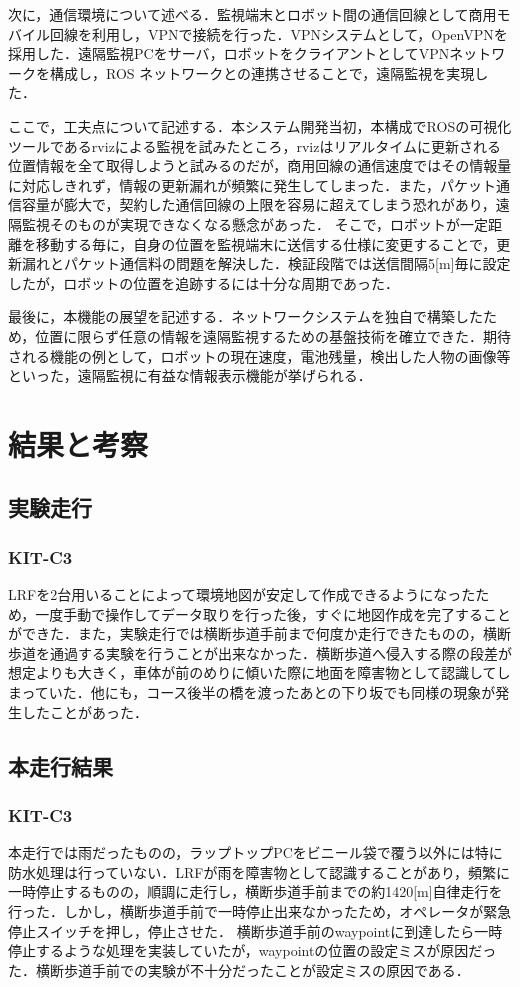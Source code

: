 \documentclass[10pt,a4paper]{jarticle}
\begin{document}
次に，通信環境について述べる．監視端末とロボット間の通信回線として商用モバイル回線を利用し，VPNで接続を行った．VPNシステムとして，OpenVPNを採用した．遠隔監視PCをサーバ，ロボットをクライアントとしてVPNネットワークを構成し，ROS ネットワークとの連携させることで，遠隔監視を実現した．

ここで，工夫点について記述する．本システム開発当初，本構成でROSの可視化ツールであるrvizによる監視を試みたところ，rvizはリアルタイムに更新される位置情報を全て取得しようと試みるのだが，商用回線の通信速度ではその情報量に対応しきれず，情報の更新漏れが頻繁に発生してしまった．また，パケット通信容量が膨大で，契約した通信回線の上限を容易に超えてしまう恐れがあり，遠隔監視そのものが実現できなくなる懸念があった．
そこで，ロボットが一定距離を移動する毎に，自身の位置を監視端末に送信する仕様に変更することで，更新漏れとパケット通信料の問題を解決した．検証段階では送信間隔5[m]毎に設定したが，ロボットの位置を追跡するには十分な周期であった．

最後に，本機能の展望を記述する．ネットワークシステムを独自で構築したため，位置に限らず任意の情報を遠隔監視するための基盤技術を確立できた．期待される機能の例として，ロボットの現在速度，電池残量，検出した人物の画像等といった，遠隔監視に有益な情報表示機能が挙げられる．

\section{結果と考察}
\subsection{実験走行}
\subsubsection{KIT-C3}
LRFを2台用いることによって環境地図が安定して作成できるようになったため，一度手動で操作してデータ取りを行った後，すぐに地図作成を完了することができた．また，実験走行では横断歩道手前まで何度か走行できたものの，横断歩道を通過する実験を行うことが出来なかった．横断歩道へ侵入する際の段差が想定よりも大きく，車体が前のめりに傾いた際に地面を障害物として認識してしまっていた．他にも，コース後半の橋を渡ったあとの下り坂でも同様の現象が発生したことがあった．

\subsection{本走行結果}
\subsubsection{KIT-C3}
本走行では雨だったものの，ラップトップPCをビニール袋で覆う以外には特に防水処理は行っていない．LRFが雨を障害物として認識することがあり，頻繁に一時停止するものの，順調に走行し，横断歩道手前までの約1420[m]自律走行を行った．しかし，横断歩道手前で一時停止出来なかったため，オペレータが緊急停止スイッチを押し，停止させた．
横断歩道手前のwaypointに到達したら一時停止するような処理を実装していたが，waypointの位置の設定ミスが原因だった．横断歩道手前での実験が不十分だったことが設定ミスの原因である．
\end{document}
